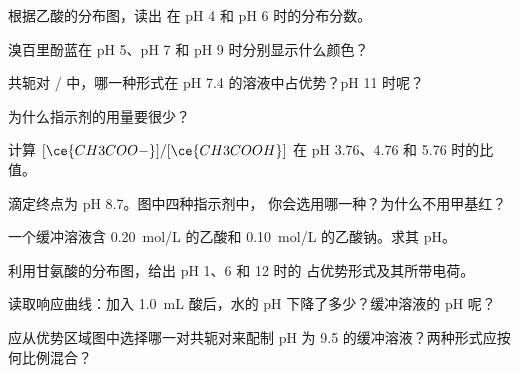 \begin{exercise}[$\star$]\label{exo:g12:buffers-predominance:2}
根据乙酸的分布图，读出
 在 pH 4 和 pH 6 时的分布分数。
\end{exercise}

\begin{exercise}[$\star$]\label{exo:g12:buffers-predominance:3}
溴百里酚蓝在 pH 5、pH 7 和 pH 9 时分别显示什么颜色？
\end{exercise}

\begin{exercise}[$\star$]\label{exo:g12:buffers-predominance:4}
共轭对 / 中，哪一种形式在
pH 7.4 的溶液中占优势？pH 11 时呢？
\end{exercise}

\begin{exercise}[$\star$]\label{exo:g12:buffers-predominance:5}
为什么指示剂的用量要很少？
\end{exercise}

\begin{exercise}[$\star\star$]\label{exo:g12:buffers-predominance:6}
计算 $[\ce{CH3COO-}]/[\ce{CH3COOH}]$ 在 pH 3.76、4.76 和
5.76 时的比值。
\end{exercise}

\begin{exercise}[$\star\star$]\label{exo:g12:buffers-predominance:7}
滴定终点为 pH 8.7。图中四种指示剂中，
你会选用哪一种？为什么不用甲基红？
\end{exercise}

\begin{exercise}[$\star\star$]\label{exo:g12:buffers-predominance:8}
一个缓冲溶液含 \qty{0.20}{mol/L} 的乙酸和
\qty{0.10}{mol/L} 的乙酸钠。求其 pH。
\end{exercise}

\begin{exercise}[$\star\star$]\label{exo:g12:buffers-predominance:9}
利用甘氨酸的分布图，给出 pH 1、6 和 12 时的
占优势形式及其所带电荷。
\end{exercise}

\begin{exercise}[$\star\star$]\label{exo:g12:buffers-predominance:10}
读取响应曲线：加入
\qty{1.0}{mL} 酸后，水的 pH 下降了多少？缓冲溶液的 pH 呢？
\end{exercise}

\begin{exercise}[$\star\star$]\label{exo:g12:buffers-predominance:11}
应从优势区域图中选择哪一对共轭对来配制
pH 为 9.5 的缓冲溶液？两种形式应按何比例混合？
\end{exercise}

